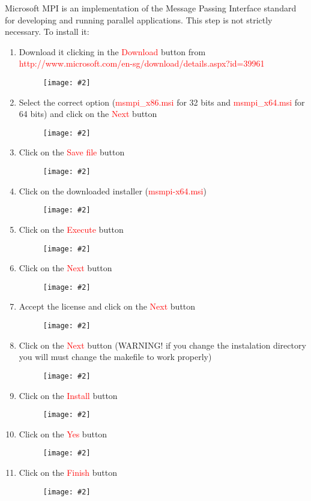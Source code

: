 \documentclass[a4paper]{article}
\newcommand{\FIG}[2]
{
	\begin{figure}[ht!]
	\centering
	\texttt{[image: \#2]}
	\end{figure}
}
\newcommand{\FIGURE}[1]{\FIG{0.35}{#1}}
\newcommand{\RED}[1] {\textcolor{red}{#1}}
\begin{document}
Microsoft MPI is an implementation of the Message Passing Interface standard for
developing and running parallel applications. This step is not strictly
necessary. To install it:

\begin{enumerate}

\item Download it clicking in the \RED{Download} button from\\
\RED{http://www.microsoft.com/en-sg/download/details.aspx?id=39961}
\FIGURE{mpi-1.png.eps}

\clearpage

\item Select the correct option (\RED{msmpi\_x86.msi} for 32 bits and
\RED{msmpi\_x64.msi} for 64 bits) and click on the \RED{Next} button
\FIGURE{mpi-2.png.eps}

\item Click on the \RED{Save file} button
\FIGURE{mpi-3.png.eps}

\clearpage

\item Click on the downloaded installer (\RED{msmpi-x64.msi})
\FIGURE{mpi-4.png.eps}

\item Click on the \RED{Execute} button
\FIGURE{mpi-5.png.eps}

\clearpage

\item Click on the \RED{Next} button
\FIGURE{mpi-6.png.eps}

\item Accept the license and click on the \RED{Next} button
\FIGURE{mpi-7.png.eps}

\clearpage

\item Click on the \RED{Next} button (WARNING! if you change the instalation
directory you will must change the makefile to work properly)
\FIGURE{mpi-8.png.eps}

\item Click on the \RED{Install} button
\FIGURE{mpi-9.png.eps}

\clearpage

\item Click on the \RED{Yes} button
\FIGURE{mpi-10.png.eps}

\item Click on the \RED{Finish} button
\FIGURE{mpi-11.png.eps}

\clearpage

\end{enumerate}
\end{document}
